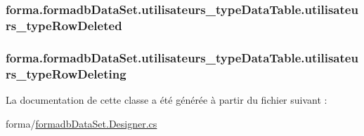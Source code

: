 \subsubsection[{\texorpdfstring{utilisateurs\+\_\+type\+Row\+Deleted}{utilisateurs_typeRowDeleted}}]{ forma.\+formadb\+Data\+Set.\+utilisateurs\+\_\+type\+Data\+Table.\+utilisateurs\+\_\+type\+Row\+Deleted}\hypertarget{classforma_1_1formadb_data_set_1_1utilisateurs__type_data_table_ad25444087fb4ef3e6c03be4e0cc81acc}{}\label{classforma_1_1formadb_data_set_1_1utilisateurs__type_data_table_ad25444087fb4ef3e6c03be4e0cc81acc}
\subsubsection[{\texorpdfstring{utilisateurs\+\_\+type\+Row\+Deleting}{utilisateurs_typeRowDeleting}}]{ forma.\+formadb\+Data\+Set.\+utilisateurs\+\_\+type\+Data\+Table.\+utilisateurs\+\_\+type\+Row\+Deleting}\hypertarget{classforma_1_1formadb_data_set_1_1utilisateurs__type_data_table_a667446ba202f25e3a4e87c74922aeb4b}{}\label{classforma_1_1formadb_data_set_1_1utilisateurs__type_data_table_a667446ba202f25e3a4e87c74922aeb4b}


La documentation de cette classe a été générée à partir du fichier suivant \+:\begin{DoxyCompactItemize}
\item 
forma/\hyperlink{formadb_data_set_8_designer_8cs}{formadb\+Data\+Set.\+Designer.\+cs}\end{DoxyCompactItemize}
